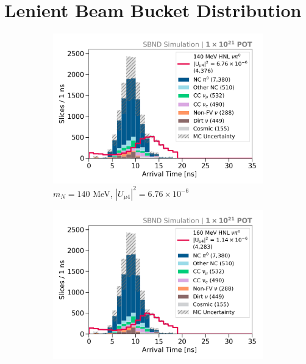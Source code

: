 
\chapter{Lenient Beam Bucket Distribution} 
\label{appendix_lenient}
\ifpdf
    \graphicspath{{Appendix4/Figs/Raster/}{Appendix4/Figs/PDF/}{Appendix4/Figs/}}
\else
    \graphicspath{{Appendix4/Figs/Vector/}{Appendix4/Figs/}}
\fi

\begin{figure}[hb!]
        \begin{subfigure}[b]{0.495\textwidth}
            \includegraphics[width=\textwidth]{m140}
            \caption{$m_N = 140$ MeV, $|U_{\mu4}|^2 = 6.76 \times 10^{-6}$ }
        \end{subfigure}
        \begin{subfigure}[b]{0.495\textwidth}
            \includegraphics[width=\textwidth]{m160}

\end{subfigure}
\end{figure}
